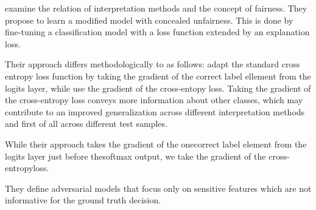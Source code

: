 
\mypar{}
\cite{dimanov2020you} examine the relation of interpretation methods and the concept of fairness. They propose to learn a modified model with concealed unfairness. This is done by fine-tuning a classification model with a loss function extended by an explanation loss. 

Their approach differs methodologically to \cite{fooling_nn_interpreters} as follows: 
\cite{fooling_nn_interpreters} adapt the standard cross entropy loss function by taking the gradient of the correct label ellement from the logits layer, while \cite{dimanov2020you} use the gradient of the cross-entopy loss. 
Taking the gradient of the cross-entropy loss conveys more information about other classes, which may contribute to an improved generalization across different interpretation methods and first of all across different test samples. 

While their approach takes the gradient of the onecorrect label element from the logits layer just before thesoftmax output, we take the gradient of the cross-entropyloss. 

They define adversarial models that focus only on sensitive features which are not informative for the ground truth decision. 


